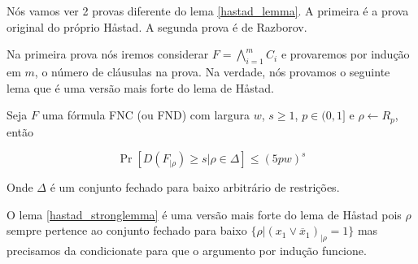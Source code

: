 Nós vamos ver 2 provas diferente do lema \ref{hastad_lemma}. A primeira é a prova original do próprio Håstad. A segunda prova é de Razborov.

Na primeira prova nós iremos considerar $F = \bigwedge_{i = 1}^{m} C_{i}$ e provaremos por indução em $m$, o número de cláusulas na prova. Na verdade, nós provamos o seguinte lema que é uma versão mais forte do lema de Håstad.

\begin{lema} \label{hastad_stronglemma}

Seja $F$ uma fórmula FNC (ou FND) com largura $w$, $s \geq 1$, $p \in (0, 1]$ e $\rho \leftarrow R_{p}$, então

\begin{equation*}
	\Pr[D(F_{\lvert \rho}) \geq s \lvert \rho \in \Delta] \leq (5pw)^{s}
\end{equation*}

Onde $\Delta$ é um conjunto fechado para baixo arbitrário de restrições.

\end{lema}

O lema \ref{hastad_stronglemma} é uma versão mais forte do lema de Håstad pois $\rho$ sempre pertence ao conjunto fechado para baixo $\{\rho \lvert (x_{1} \lor \overline{x}_{1})_{\lvert \rho} = 1\}$ mas precisamos da condicionate para que o argumento por indução funcione.

